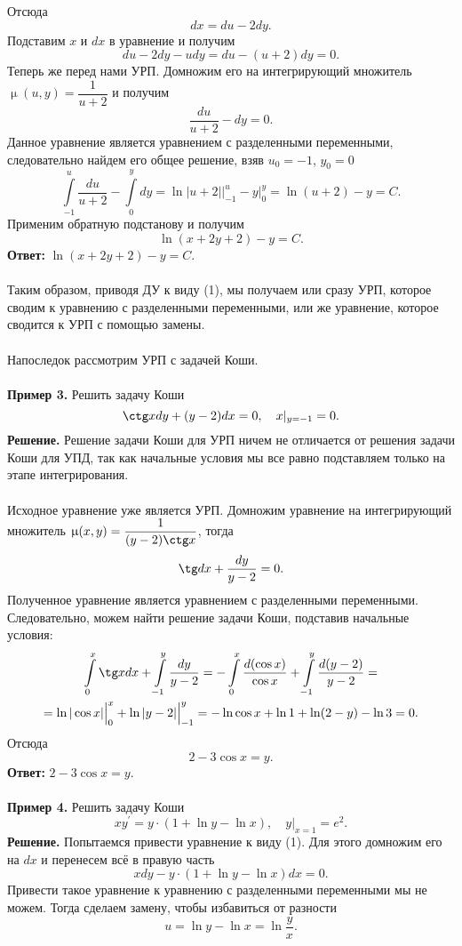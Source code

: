 \documentclass[a4paper, 12pt]{article}
\renewcommand{\mu}{\upmu}
\begin{document}
Отсюда $$dx = du - 2dy.$$
Подставим $x$ и $dx$ в уравнение и получим $$du - 2dy - udy = du - (u+2)dy = 0.$$
Теперь же перед нами УРП. Домножим его на интегрирующий множитель $\mu(u,y) = \dfrac{1}{u+2}$ и получим $$\dfrac{du}{u+2} - dy = 0.$$
Данное уравнение является уравнением с разделенными переменными, следовательно найдем его общее решение, взяв $u_0 = -1$, $y_0 =0$ $$
	\int\limits^u_{-1}\dfrac{du}{u+2} - \int\limits^y_{0} dy = \ln|u+2|\Big|_{-1}^u - y\Big|_0^y = \ln(u+2) - y = C.
$$
Применим обратную подстанову и получим $$\ln (x+2y + 2) - y = C.$$
\textbf{Ответ:} $\ln (x+2y + 2) - y = C.$\\\\
Таким образом, приводя ДУ к виду (1), мы получаем или сразу УРП, которое сводим к уравнению с разделенными переменными, или же уравнение, которое сводится к УРП с помощью замены.\\\\
Напоследок рассмотрим УРП с задачей Коши.\\\\
\textbf{Пример 3.} Решить задачу Коши $$\ctg xdy + (y-2)dx = 0, \quad x|_{y=-1} = 0.$$
\textbf{Решение.} Решение задачи Коши для УРП ничем не отличается от решения задачи Коши для УПД, так как начальные условия мы все равно подставляем только на этапе интегрирования.\\\\ Исходное уравнение уже является УРП. Домножим уравнение на интегрирующий множитель $\mu(x,y) = \dfrac{1}{(y-2)\ctg x}$, тогда $$\tg dx + \dfrac{dy}{y-2} = 0.$$ Полученное уравнение является уравнением с разделенными переменными. Следовательно, можем найти решение задачи Коши, подставив начальные условия: 
\begin{multline*}
	\int\limits_0^x\tg x dx + \int\limits_{-1}^y\dfrac{dy}{y-2} =	-\int\limits_0^x\dfrac{d(\cos x)}{\cos x} + \int\limits_{-1}^y\dfrac{d(y-2)}{y-2} =\\= \ln|\cos x|\Big|_{0}^x+ \ln|y-2|\Big|_{-1}^y = -\ln\cos x + \ln 1 + \ln (2-y) - \ln 3 = 0.
\end{multline*}
Отсюда $$ 2- 3\cos x = y.$$
\textbf{Ответ:} $ 2- 3\cos x = y.$\\\\
\textbf{Пример 4.} Решить задачу Коши $$xy^\prime = y\cdot (1 + \ln y - \ln x), \quad y|_{x=1} = e^2.$$
\textbf{Решение.} Попытаемся привести уравнение к виду (1). Для этого домножим его на $dx$ и перенесем всё в правую часть
$$xdy - y\cdot (1 + \ln y - \ln x) dx = 0.$$
Привести такое уравнение к уравнению с разделенными переменными мы не можем. Тогда сделаем замену, чтобы избавиться от разности $$ u = \ln y - \ln x = \ln \dfrac{y}{x}.$$
\end{document}
